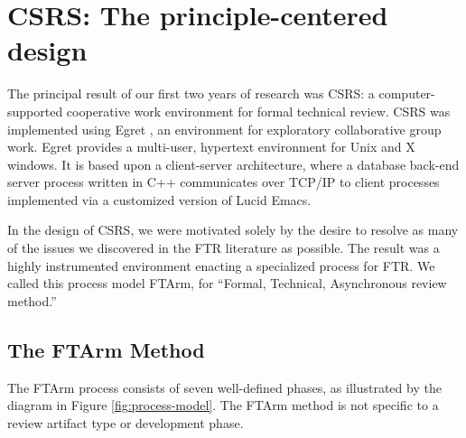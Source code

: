  


\section{CSRS: The principle-centered design}

The principal result of our first two years of research was CSRS: a
computer-supported cooperative work environment for formal technical
review. CSRS was implemented using Egret \cite{csdl-92-01}, an environment
for exploratory collaborative group work.  Egret provides a multi-user,
hypertext environment for Unix and X windows.  It is based upon a
client-server architecture, where a database back-end server process
written in C++ communicates over TCP/IP to client processes implemented via
a customized version of Lucid Emacs.

In the design of CSRS, we were motivated solely by the desire to resolve as
many of the issues we discovered in the FTR literature as possible.  The
result was a highly instrumented environment enacting a specialized
process for FTR.  We called this process model FTArm, for ``Formal,
Technical, Asynchronous review method.''


\begin{figure*} [t]
 {\centerline{}}
\caption{{\em The seven phases in the FTArm method, along with the primary
entry condition for each phase.}}
\label{fig:process-model}
\end{figure*}

\subsection{The FTArm Method}

The FTArm process consists of seven well-defined phases, as illustrated by
the diagram in Figure \ref{fig:process-model}. The FTArm method is not
specific to a review artifact type or development phase.

